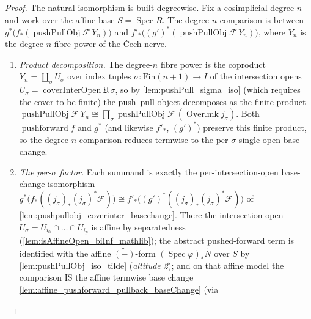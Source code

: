 \begin{proof}
  The natural isomorphism is built degreewise. Fix a cosimplicial degree \(n\) and work over
  the affine base \(S = \operatorname{Spec} R\). The degree-\(n\) comparison is between
  \(g^*\bigl(f_*(\operatorname{pushPullObj}\mathcal{F}\, Y_n)\bigr)\) and
  \(f'_*\bigl((g')^*(\operatorname{pushPullObj}\mathcal{F}\, Y_n)\bigr)\), where \(Y_n\) is the
  degree-\(n\) fibre power of the {\v C}ech nerve.
  \begin{enumerate}
    \item \emph{Product decomposition.} The degree-\(n\) fibre power is the coproduct
      \(Y_n = \coprod_\sigma U_\sigma\) over index tuples \(\sigma : \mathrm{Fin}(n+1) \to I\)
      of the intersection opens \(U_\sigma = \operatorname{coverInterOpen}\mathfrak{U}\,\sigma\),
      so by \cref{lem:pushPull_sigma_iso} (which requires the cover to be finite) the
      push--pull object decomposes as the finite product \(\operatorname{pushPullObj}\mathcal{F}\,
      Y_n \cong \prod_\sigma \operatorname{pushPullObj}\mathcal{F}\,(\operatorname{Over.mk}
      j_\sigma)\). Both \(\operatorname{pushforward} f\) and \(g^*\) (and likewise \(f'_*\),
      \((g')^*\)) preserve this finite product, so the degree-\(n\) comparison reduces termwise
      to the per-\(\sigma\) single-open base change.
    \item \emph{The per-\(\sigma\) factor.} Each summand is exactly the per-intersection-open
      base-change isomorphism \(g^*\bigl(f_*((j_\sigma)_*(j_\sigma)^*\mathcal{F})\bigr) \cong
      f'_*\bigl((g')^*((j_\sigma)_*(j_\sigma)^*\mathcal{F})\bigr)\) of
      \cref{lem:pushpullobj_coverinter_basechange}. There the intersection open
      \(U_\sigma = U_{i_0} \cap \dots \cap U_{i_p}\) is affine by separatedness
      (\cref{lem:isAffineOpen_biInf_mathlib}); the abstract pushed-forward term is identified
      with the affine \(\widetilde{(-)}\)-form \((\operatorname{Spec}\varphi)_*\widetilde{N}\)
      over \(S\) by \cref{lem:pushPullObj_iso_tilde} (\emph{altitude 2}); and on that affine
      model the comparison IS the affine termwise base change
      \cref{lem:affine_pushforward_pullback_baseChange} (via

\end{enumerate}
\end{proof}
